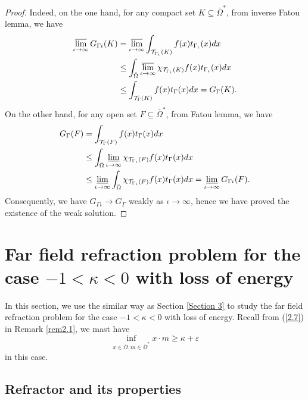 \documentclass[a4paper,12pt,]{article}
\numberwithin{equation}{section}
\numberwithin{equation}{section} \allowdisplaybreaks
\begin{document}
\begin{proof}
  Indeed, on the one hand, for any compact set $K \subseteq \bar{\Omega}^{\ast}$, from inverse Fatou lemma, we have
  \begin{align*}
    \varlimsup_{\iota \rightarrow \infty} G_{\Gamma{\iota}}(K) & = \varlimsup_{\iota \rightarrow \infty} \int_{\mathcal{T}_{\Gamma_{\iota}}(K)}f(x)t_{\Gamma_{\iota}}(x)dx \\
      & \leq \int_{\bar{\Omega}} \varlimsup_{\iota \rightarrow \infty} \chi_{\mathcal{T}_{\Gamma_{\iota}}(K)} f(x)t_{\Gamma_{\iota}}(x)dx\\
      & \leq \int_{\mathcal{T}_{\Gamma}(K)}f(x)t_{\Gamma}(x)dx = G_{\Gamma}(K).
  \end{align*}
  On the other hand, for any open set $F \subseteq \bar{\Omega}^{\ast}$, from Fatou lemma, we have
  \begin{align*}
    G_{\Gamma}(F) & = \int_{\mathcal{T}_{\Gamma}(F)}f(x)t_{\Gamma}(x)dx \\
     & \leq \int_{\bar{\Omega}}\varliminf_{\iota \rightarrow \infty}\chi_{\mathcal{T}_{\Gamma_{\iota}}(F)}f(x)t_{\Gamma}(x)dx \\
     & \leq \varliminf_{\iota \rightarrow \infty} \int_{\bar{\Omega}}\chi_{\mathcal{T}_{\Gamma_{\iota}}(F)}f(x)t_{\Gamma}(x)dx = \varliminf_{\iota \rightarrow \infty} G_{\Gamma{\iota}}(F).
  \end{align*}
  Consequently, we have $G_{\Gamma{\iota}} \rightarrow G_{\Gamma}$ weakly as $\iota \rightarrow \infty$, hence we have proved the existence of the weak solution.
\end{proof}


\section{Far field refraction problem for the case $-1 <\kappa <0$ with loss of energy}\label{Section 4}

\sloppy{}

In this section, we use the similar way as Section \ref{Section 3} to study the far field refraction problem for the case $-1 <\kappa <0$ with loss of energy. Recall from (\ref{2.7}) in Remark \ref{rem2.1}, we mast have
\begin{equation*}
  \inf_{x \in \bar{\Omega}, m \in \bar{\Omega}^{\ast}} x \cdot m \geq \kappa + \varepsilon
\end{equation*}
in this case.

\subsection{Refractor and its properties}
\end{document}
